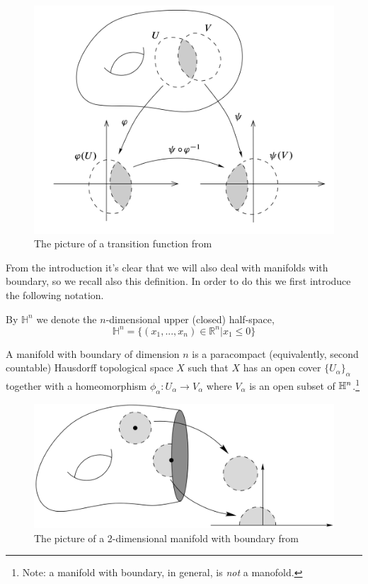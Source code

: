 \begin{figure}
    \centering
    \captionsetup{format = hang}
    \includegraphics[width=12cm]{images/Lecture 2/Lee_TransitionMap .png} 
    \caption{\small{The picture of a transition function from \cite{Lee2012}}}
    \label{fig:Lee_TransitionMap}
\end{figure}

From the introduction it's clear that we will also deal with manifolds with boundary, so we recall also this definition. In order to do this we first introduce the following notation.
\begin{notat}
    By $\mathbb{H}^n$ we denote the $n$-dimensional upper (closed) half-space,
    $$\mathbb{H}^n=\{(x_1,...,x_n)\in\mathbb{R}^n|x_1 \leq 0\}$$ 
\end{notat}
\begin{defn}
    A manifold with boundary of dimension $n$ is a paracompact (equivalently, second countable) Hausdorff topological space $X$ such that $X$ has an open cover $\{U_\alpha\}_\alpha$ together with a homeomorphism $\phi_\alpha:U_\alpha\to V_\alpha$ where $V_\alpha$ is an open subset of $\mathbb{H}^n$.\footnote{Note: a manifold with boundary, in general, is \textit{not} a manofold.}
\end{defn}
\begin{figure}
    \centering
    \captionsetup{format = hang}
    \includegraphics[width=12cm]{images/Lecture 2/Manifold with boundary.png} 
    \caption{\small{The picture of a 2-dimensional manifold with boundary from \cite{Lee2012}}}
    \label{fig:Manifold_w_boundary}
\end{figure}

